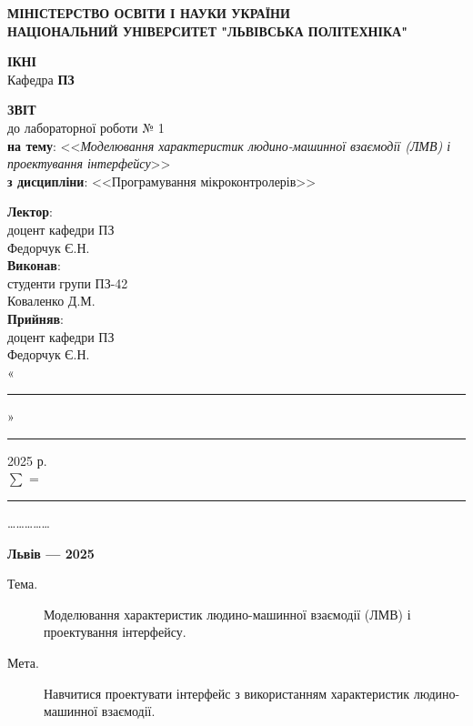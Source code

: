 \documentclass[14pt]{extreport}
\newcommand\subject{Програмування мікроконтролерів}
\newcommand\lecturer{доцент кафедри ПЗ\\Федорчук Є.Н.}
\newcommand\teacher{доцент кафедри ПЗ\\Федорчук Є.Н.}
\newcommand\mygroup{ПЗ-42}
\newcommand\lab{1}
\newcommand\theme{Моделювання характеристик людино-машинної взаємодії (ЛМВ) і проектування інтерфейсу}
\newcommand\purpose{Навчитися проектувати інтерфейс з використанням характеристик людино-машинної взаємодії}
\begin{document}
\begin{normalsize}
	\begin{titlepage}
		\thispagestyle{empty}
		\begin{center}
			\textbf{МІНІСТЕРСТВО ОСВІТИ І НАУКИ УКРАЇНИ\\
				НАЦІОНАЛЬНИЙ УНІВЕРСИТЕТ "ЛЬВІВСЬКА ПОЛІТЕХНІКА"}
		\end{center}
		\begin{flushright}
			\textbf{ІКНІ}\\
			Кафедра \textbf{ПЗ}
		\end{flushright}
		\vspace{20pt}
		\begin{center}
			\textbf{ЗВІТ}\\
			\vspace{10pt}
			до лабораторної роботи № \lab\\
			\textbf{на тему}: <<\textit{\theme}>>\\
			\textbf{з дисципліни}: <<\subject>>
		\end{center}
		\vspace{20pt}
		\begin{flushright}
			
			\textbf{Лектор}:\\
			\lecturer\\
			\vspace{28pt}
			\textbf{Виконав}:\\
			
			студенти групи \mygroup\\
			Коваленко Д.М.\\
			\vspace{28pt}
			\textbf{Прийняв}:\\
			
			\teacher\\
			
			\vspace{28pt}
			«\rule{1cm}{0.15mm}» \rule{1.5cm}{0.15mm} 2025 р.\\
			$\sum$ = \rule{1cm}{0.15mm}……………\\
			
		\end{flushright}
		\vspace{\fill}
		\begin{center}
			\textbf{Львів — 2025}
		\end{center}
	\end{titlepage}
		
	\begin{description}
		\item[Тема.] \theme.
		\item[Мета.] \purpose.
	\end{description}


\end{normalsize}
\end{document}
